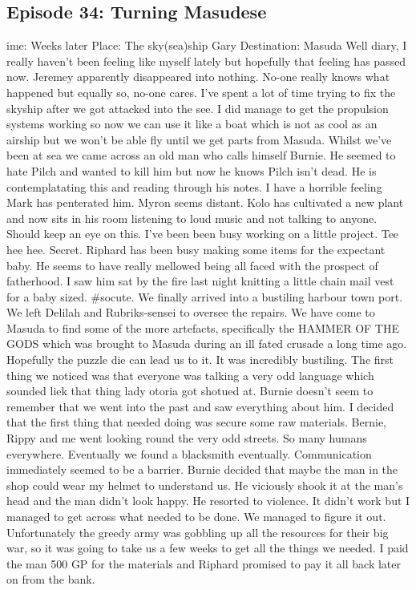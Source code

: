 \subsection{Episode 34: Turning Masudese}
ime: Weeks later\medskip
Place: The sky(sea)ship Gary\medskip
Destination: Masuda\medskip
Well diary, I really haven’t been feeling like myself lately but hopefully that feeling has passed now. Jeremey apparently disappeared into nothing. No-one really knows what happened but equally so, no-one cares.\medskip
I’ve spent a lot of time trying to fix the skyship after we got attacked into the see. I did manage to get the propulsion systems working so now we can use it like a boat which is not as cool as an airship but we won’t be able fly until we get parts from Masuda. Whilst we’ve been at sea we came across an old man who calls himself Burnie. He seemed to hate Pilch and wanted to kill him but now he knows Pilch isn’t dead. He is contemplatating this and reading through his notes. I have a horrible feeling Mark has penterated him.\medskip
Myron seems distant.\medskip
Kolo has cultivated a new plant and now sits in his room listening to loud music and not talking to anyone. Should keep an eye on this.\medskip
I’ve been been busy working on a little project. Tee hee hee. Secret.\medskip
Riphard has been busy making some items for the expectant baby. He seems to have really mellowed being all faced with the prospect of fatherhood. I saw him sat by the fire last night knitting a little chain mail vest for a baby sized. \#socute.\medskip
We finally arrived into a bustiling harbour town port. We left Delilah and Rubriks-sensei to oversee the repairs. We have come to Masuda to find some of the more artefacts, specifically the HAMMER OF THE GODS which was brought to Masuda during an ill fated crusade a long time ago. Hopefully the puzzle die can lead us to it. It was incredibly bustiling. The first thing we noticed was that everyone was talking a very odd language which sounded liek that thing lady otoria got shotued at. Burnie doesn’t seem to remember that we went into the past and saw everything about him. I decided that the first thing that needed doing was secure some raw materials. Bernie, Rippy and me went looking round the very odd streets. So many humans everywhere. Eventually we found a blacksmith eventually. Communication immediately seemed to be a barrier. Burnie decided that maybe the man in the shop could wear my helmet to understand us. He viciously shook it at the man’s head and the man didn’t look happy. He resorted to violence. It didn’t work but I managed to get across what needed to be done. We managed to figure it out. Unfortunately the greedy army was gobbling up all the resources for their big war, so it was going to take us a few weeks to get all the things we needed. I paid the man 500 GP for the materials and Riphard promised to pay it all back later on from the bank.\medskip

